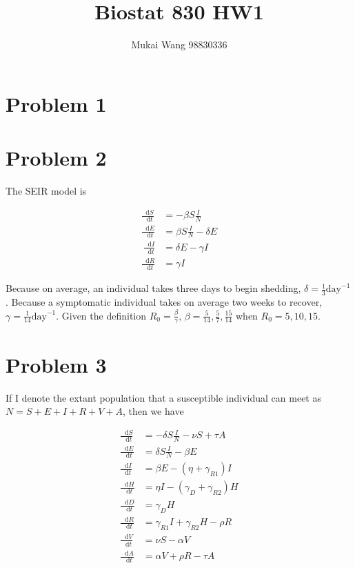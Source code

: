 \documentclass[12pt]{article}
\title{Biostat 830 HW1}
\date{}
\author{Mukai Wang 98830336}
\newcommand*\diff{\mathop{}\!\mathrm{d}}
\begin{document}
\maketitle

\section*{Problem 1}

\section*{Problem 2}

The SEIR model is

\begin{align*}
	\frac{\diff S}{\diff t} &= -\beta S \frac{I}{N}\\
	\frac{\diff E}{\diff t} &= \beta S \frac{I}{N} - \delta E\\\
	\frac{\diff I}{\diff t} &= \delta E - \gamma I\\
	\frac{\diff R}{\diff t} &= \gamma I
\end{align*}

Because on average, an individual takes three days to begin shedding, $\delta = \frac{1}{3} \text{day}^{-1}$. Because a symptomatic individual takes on average two weeks to recover, $\gamma = \frac{1}{14} \text{day}^{-1}$. Given the definition $R_{0} = \frac{\beta}{\gamma}$, $\beta = \frac{5}{14}, \frac{5}{7}, \frac{15}{14}$ when $R_{0} = 5, 10, 15$.

\section*{Problem 3}

If I denote the extant population that a susceptible individual can meet as $N = S+E+I+R+V+A$, then we have

\begin{align*}
	\frac{\diff S}{\diff t} &= -\delta S \frac{I}{N} - \nu S + \tau A\\
	\frac{\diff E}{\diff t} &= \delta S \frac{I}{N} - \beta E\\
	\frac{\diff I}{\diff t} &= \beta E - (\eta + \gamma_{R1})I \\
	\frac{\diff H}{\diff t} &= \eta I-(\gamma_{D}+\gamma_{R2})H \\
	\frac{\diff D}{\diff t} &= \gamma_{D} H\\
	\frac{\diff R}{\diff t} &= \gamma_{R1} I + \gamma_{R2} H - \rho R\\
	\frac{\diff V}{\diff t} &= \nu S - \alpha V\\
	\frac{\diff A}{\diff t} &= \alpha V+\rho R - \tau A
\end{align*}
\end{document}
